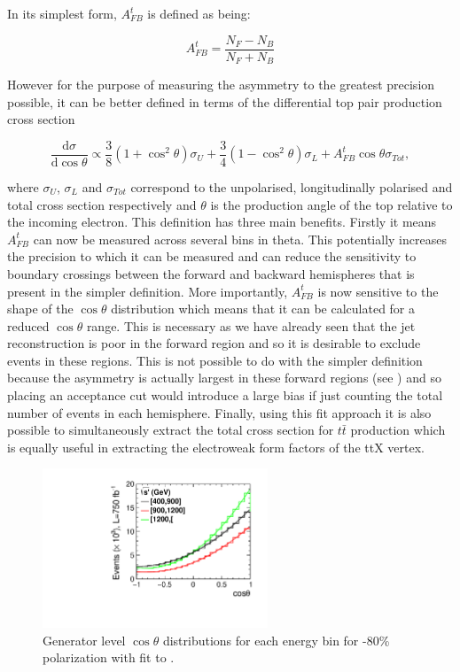 In its simplest form, $A_{FB}^t$ is defined as being:

\begin{equation}
A_{FB}^t=\frac{N_F-N_B}{N_F+N_B}
\end{equation}

However for the purpose of measuring the asymmetry to the greatest precision possible, it can be better defined in terms of the differential top pair production cross section\cite{PhysRevD.25.1218}

\begin{equation}
  \label{eq:afbfit}
\frac{\mathrm{d}\sigma}{\mathrm{d}\cos\theta} \propto \frac{3}{8}(1+\cos^{2}\theta)\sigma_{U} + \frac{3}{4}(1-\cos^{2}\theta)\sigma_{L} + A_{FB}^{t}\cos\theta\sigma_{Tot},
\end{equation}

where $\sigma_U$, $\sigma_L$ and $\sigma_{Tot}$ correspond to the unpolarised, longitudinally polarised and total cross section respectively and $\theta$ is the production angle of the top relative to the incoming electron. This definition has three main benefits. Firstly it means $A_{FB}^t$ can now be measured across several bins in theta. This potentially increases the precision to which it can be measured and can reduce the sensitivity to boundary crossings between the forward and backward hemispheres that is present in the simpler definition. More importantly, $A_{FB}^t$ is now sensitive to the shape of the $\cos\theta$ distribution which means that it can be calculated for a reduced $\cos\theta$ range. This is necessary as we have already seen that the jet reconstruction is poor in the forward region and so it is desirable to exclude events in these regions. This is not possible to do with the simpler definition because the asymmetry is actually largest in these forward regions (see ) and so placing an acceptance cut would introduce a large bias if just counting the total number of events in each hemisphere. Finally, using this fit approach it is also possible to simultaneously extract the total cross section for $t\bar{t}$ production which is equally useful in extracting the electroweak form factors of the ttX vertex.

\begin{figure}
  \centering
  \includegraphics[width=0.6\textwidth]{TopAnalysis/figures/GeneratorTheta.pdf}
  \caption[Generator level $\cos\theta$ distributions for each energy bin]{Generator level $\cos\theta$ distributions for each energy bin for -80\% polarization with fit to .}
  \label{fig:mctheta}
\end{figure}

